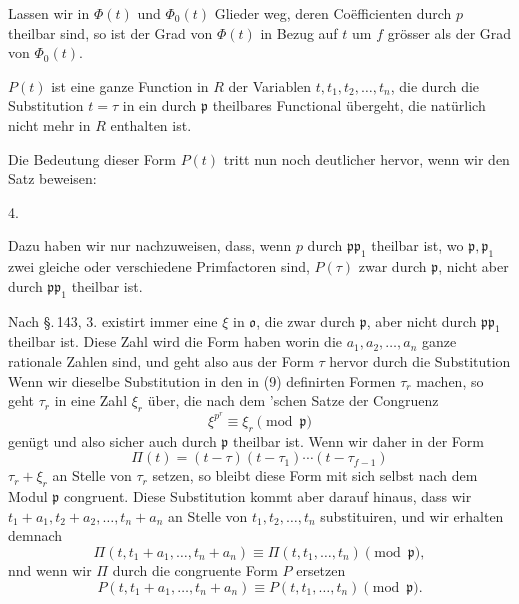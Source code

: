 Lassen wir in $\Phi(t)$ und $\Phi_0(t)$ Glieder weg, deren Coëfficienten durch $p$ theilbar sind, so ist der Grad von $\Phi(t)$ in Bezug auf $t$ um $f$ grösser als der Grad von $\Phi_0(t)$.

$P(t)$ ist eine ganze Function in $R$ der Variablen $t, t_1, t_2, \ldots, t_n$, die durch die Substitution $t=\tau$ in ein durch $\mathfrak p$ theilbares Functional übergeht, die natürlich nicht mehr in $R$ enthalten ist.

Die Bedeutung dieser Form $P(t)$ tritt nun noch deutlicher hervor, wenn wir den Satz beweisen:

4. 

Dazu haben wir nur nachzuweisen, dass, wenn $p$ durch $\mathfrak p \mathfrak p_1$ theilbar ist, wo $\mathfrak p, \mathfrak p_1$ zwei gleiche oder verschiedene Primfactoren sind, $P(\tau)$ zwar durch $\mathfrak p$, nicht aber durch $\mathfrak p \mathfrak p_1$ theilbar ist.

Nach \S.\,143, 3. existirt immer eine  $\xi$ in $\mathfrak{o}$, die zwar durch $\mathfrak p$, aber nicht durch $\mathfrak p \mathfrak p_1$ theilbar ist. Diese Zahl wird die Form haben
worin die $a_1, a_2, \ldots, a_n$ ganze rationale Zahlen sind, und geht also aus der Form $\tau$ hervor durch die Substitution
Wenn wir dieselbe Substitution in den in (9) definirten Formen $\tau_r$ machen, so geht $\tau_r$ in eine Zahl $\xi_r$ über, die nach dem 'schen Satze der Congruenz
\[ \xi^{p^r} \equiv \xi_r \pmod{\mathfrak p} \]
genügt und also sicher auch durch $\mathfrak p$ theilbar ist. Wenn wir daher in der Form
\[ \Pi(t) = (t-\tau)(t-\tau_1) \cdots (t - \tau_{f-1}) \]
$\tau_r + \xi_r$ an Stelle von $\tau_r$ setzen, so bleibt diese Form mit sich selbst nach dem Modul $\mathfrak p$ congruent. Diese Substitution kommt aber darauf hinaus, dass wir $t_1+a_1, t_2+a_2, \ldots, t_n+a_n$ an Stelle von $t_1, t_2, \ldots, t_n$ substituiren, und wir erhalten demnach
\[ \Pi(t, t_1+a_1, \ldots, t_n+a_n) \equiv \Pi(t, t_1, \ldots, t_n) \pmod{\mathfrak p}, \]
nnd wenn wir $\Pi$ durch die congruente Form $P$ ersetzen
\[ P(t, t_1+a_1, \ldots, t_n+a_n) \equiv P(t, t_1, \ldots, t_n) \pmod{\mathfrak p}. \]
